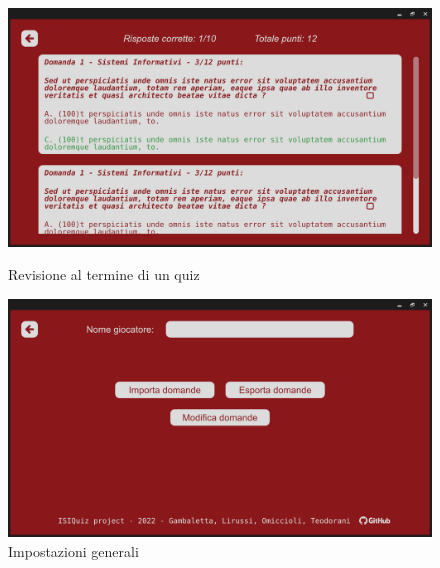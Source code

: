         \begin{figure}[H]
          \centering
          \begin{minipage}[b]{0.48\textwidth}
             \includegraphics[width=\textwidth]{Images/mockup/review.png}
            \caption{Revisione al termine di un quiz}
            \label{fig:review}
          \end{minipage}
          \hfill
          \begin{minipage}[b]{0.48\textwidth}
            \includegraphics[width=\textwidth]{Images/mockup/settings3.png}
            \caption{Impostazioni generali}
            \label{fig:settings3}
          \end{minipage}
        \end{figure}

